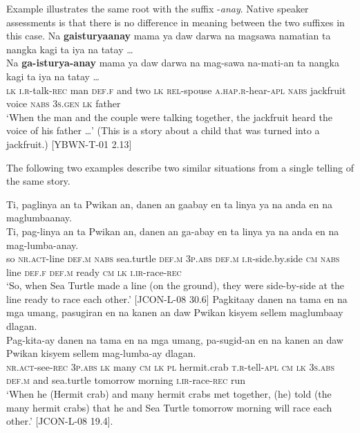 Example  illustrates the same root with the suffix -\textit{anay}. Native speaker assessments is that there is no difference in meaning between the two suffixes in this case.
\ea
\label{ex:jackfruit}
Na  \textbf{gaisturyaanay}  mama  ya  daw  darwa  na  magsawa namatian  ta  nangka  kagi  ta  iya  na  tatay … \\\smallskip
\gll Na  \textbf{ga-isturya-anay}  mama  ya  daw  darwa  na mag-sawa na-mati-an  ta  nangka  kagi  ta  iya  na  tatay … \\
\textsc{lk}  \textsc{i.r}-talk-\textsc{rec}  man  \textsc{def.f} and  two  \textsc{lk}  \textsc{rel}-spouse
\textsc{a.hap.r}-hear-\textsc{apl}  \textsc{nabs}  jackfruit  voice  \textsc{nabs}  3\textsc{s.gen}  \textsc{lk}  father \\
\glt `When the man and the couple were talking together, the jackfruit heard the voice of his father …’ (This is a story about a child that was turned into a jackfruit.) [YBWN-T-01 2.13]
\z

\hspace*{-3.9pt}The following two examples describe two similar situations from a single telling of the same story.

\ea
\label{ex:raceeachother-1}
Ti,	paglinya	an	ta	Pwikan	an,	danen	an	gaabay	en	ta linya	ya	na	anda	en	na	maglumbaanay. \\\smallskip
\gll Ti,	pag-linya	an	ta	Pwikan	an,	danen	an	ga-abay	en	ta linya	ya	na	anda	en	na	mag-lumba-anay. \\
so	\textsc{nr.act}-line	\textsc{def.m}	\textsc{nabs}	sea.turtle	\textsc{def.m}	3\textsc{p.abs}	\textsc{def.m}	\textsc{i.r}-side.by.side	\textsc{cm}	\textsc{nabs} line	\textsc{def.f}	\textsc{def.m}	ready	\textsc{cm}	\textsc{lk}	\textsc{i.ir}-race-\textsc{rec} \\
\glt `So, when Sea Turtle made a line (on the ground), they were side-by-side at the line ready  to race each other.' [JCON-L-08 30.6]
\z
\ea
\label{ex:raceeachother-2}
Pagkitaay	danen	na	tama	en	na	mga	umang,	pasugiran	en	na kanen	an	daw	Pwikan	kisyem	sellem	 maglumbaay	dlagan. \\
\gll Pag-kita-ay	danen	na	tama	en	na	mga	umang,	pa-sugid-an	en	na kanen an	daw	Pwikan	kisyem	sellem	 mag-lumba-ay	dlagan. \\
\textsc{nr.act}-see-\textsc{rec}	3\textsc{p.abs}	\textsc{lk}	many	\textsc{cm}	\textsc{lk}	\textsc{pl}	hermit.crab	\textsc{t.r}-tell-\textsc{apl} \textsc{cm}	\textsc{lk} 3\textsc{s.abs}	\textsc{def.m}	and	sea.turtle	tomorrow	morning	\textsc{i.ir}-race-\textsc{rec}	run \\
\glt ‘When he (Hermit crab) and many hermit crabs met together, (he) told (the many hermit crabs) that he and Sea Turtle tomorrow morning will race each other.’ [JCON-L-08 19.4].
\z

